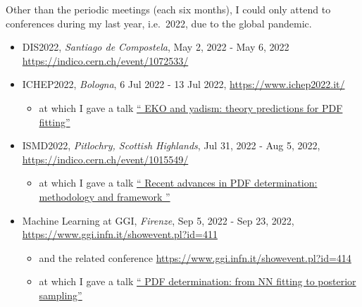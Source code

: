 Other than the periodic \nnpdf{} meetings (each six months), I could only
attend to conferences during my last year, i.e.\ 2022, due to the global
pandemic.

\begin{itemize}
    \item DIS2022, \textit{Santiago de Compostela}, May 2, 2022 -  May 6, 2022
        \url{https://indico.cern.ch/event/1072533/}
    \item ICHEP2022, \textit{Bologna}, 6 Jul 2022 - 13 Jul 2022,
        \url{https://www.ichep2022.it/}
        \begin{itemize}
            \item at which I gave a talk
                \href{https://agenda.infn.it/event/28874/contributions/169937/}{\enquote{
                EKO and yadism: theory predictions for PDF fitting}}
        \end{itemize}
    \item ISMD2022, \textit{Pitlochry, Scottish Highlands}, Jul 31, 2022 - Aug
        5, 2022, \url{https://indico.cern.ch/event/1015549/}
        \begin{itemize}
            \item at which I gave a talk
                \href{https://indico.cern.ch/event/1015549/contributions/4903597/}{\enquote{
                Recent advances in PDF determination: methodology and framework
                }}
        \end{itemize}
    \item Machine Learning at GGI, \textit{Firenze}, Sep 5, 2022 - Sep 23,
        2022, \url{https://www.ggi.infn.it/showevent.pl?id=411}
        \begin{itemize}
            \item and the related conference
                \url{https://www.ggi.infn.it/showevent.pl?id=414}
            \item at which I gave a talk
                \href{https://agenda.infn.it/event/32052/contributions/178133/}{\enquote{
                PDF determination: from NN fitting to posterior sampling}}
        \end{itemize}
\end{itemize}
